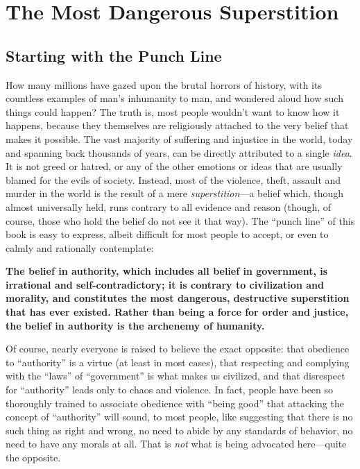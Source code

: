 \documentclass{book}
\begin{document}
\chapter{The Most Dangerous Superstition}

\section{Starting with the Punch Line}

How many millions have gazed upon the brutal horrors of history, with its countless examples of man's inhumanity to man, and wondered aloud how such things could happen? The truth is, most people wouldn't want to know how it happens, because they themselves are religiously attached to the very belief that makes it possible. The vast majority of suffering and injustice in the world, today and spanning back thousands of years, can be directly attributed to a single \emph{idea}. It is not greed or hatred, or any of the other emotions or ideas that are usually blamed for the evils of society. Instead, most of the violence, theft, assault and murder in the world is the result of a mere \emph{superstition}---a belief which, though almost universally held, runs contrary to all evidence and reason (though, of course, those who hold the belief do not see it that way). The \enquote{punch line} of this book is easy to express, albeit difficult for most people to accept, or even to calmly and rationally contemplate:

\textbf{The belief in authority, which includes all belief in government, is irrational and self-contradictory; it is contrary to civilization and morality, and constitutes the most dangerous, destructive superstition that has ever existed. Rather than being a force for order and justice, the belief in authority is the archenemy of humanity.}

Of course, nearly everyone is raised to believe the exact opposite: that obedience to \enquote{authority} is a virtue (at least in most cases), that respecting and complying with the \enquote{laws} of \enquote{government} is what makes us civilized, and that disrespect for \enquote{authority} leads only to chaos and violence. In fact, people have been so thoroughly trained to associate obedience with \enquote{being good} that attacking the concept of \enquote{authority} will sound, to most people, like suggesting that there is no such thing as right and wrong, no need to abide by any standards of behavior, no need to have any morals at all. That is \emph{not} what is being advocated here---quite the opposite.
\end{document}
